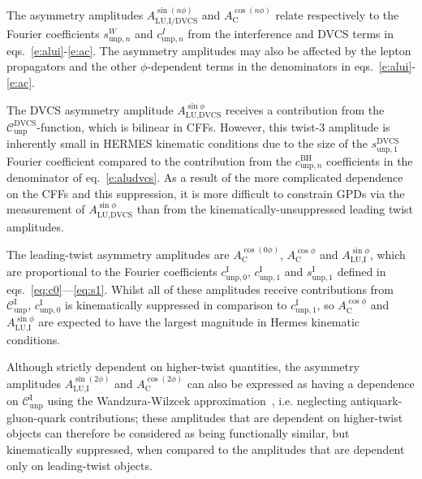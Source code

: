 The asymmetry amplitudes $A_{\textrm{LU,I/DVCS}}^{\sin(n\phi)}$ and
$A_{\textrm{C}}^{\cos(n\phi)}$ relate respectively to the Fourier
coefficients $s_{\textrm{unp},n}^{W}$ and $c_{\textrm{unp},n}^{I}$ from the interference and DVCS terms in eqs.~\ref{e:alui}-\ref{e:ac}. The asymmetry amplitudes
may also be affected by the lepton propagators and the other
$\phi$-dependent terms in the denominators in
eqs.~\ref{e:alui}-\ref{e:ac}.

The DVCS asymmetry amplitude $A^{\sin\phi}_{\textrm{LU,DVCS}}$ receives a
contribution from the $\mathcal{C}_{\textrm{unp}}^{\textrm{DVCS}}$-function,
which is bilinear in CFFs. However, this twist-3 amplitude is inherently small in HERMES kinematic conditions due to the size of the $s_{\textrm{unp},1}^{\textrm{DVCS}}$ Fourier coefficient compared to the contribution from the $c_{\textrm{unp},n}^{\textrm{BH}}$ coefficients in the denominator of eq.~\ref{e:aludvcs}. As a result of the more complicated dependence on the CFFs and this suppression, it
is more difficult to constrain GPDs via the measurement of $A^{\sin\phi}_{\textrm{LU,DVCS}}$ than from the kinematically-unsuppressed leading twist amplitudes.

The leading-twist asymmetry amplitudes are $A_{\textrm{C}}^{\cos(0\phi)}$, $A_{\textrm{C}}^{\cos\phi}$ and $A_{\textrm{LU,I}}^{\sin\phi}$, which are proportional to the Fourier coefficients $c_{\textrm{unp},0}^{\textrm{I}}$, $c_{\textrm{unp},1}^{\textrm{I}}$ and $s_{\textrm{unp},1}^{\textrm{I}}$ defined in eqs.~\ref{eq:c0}---\ref{eq:s1}. Whilst all of these amplitudes receive contributions from $\mathcal{C}_{\textrm{unp}}^{\textrm{I}}$, $c_{\textrm{unp},0}^{\textrm{I}}$ is kinematically suppressed in comparison to $c_{\textrm{unp},1}^{\textrm{I}}$, so $A_{\textrm{C}}^{\cos\phi}$ and $A_{\textrm{LU,I}}^{\sin\phi}$ are expected to have the largest magnitude in H{\sc ermes} kinematic conditions.

Although strictly dependent on higher-twist quantities, the asymmetry amplitudes $A_{\textrm{LU},\textrm{I}}^{\sin(2\phi)}$ and $A^{\cos(2\phi)}_{\textrm{C}}$ can also be expressed as having a dependence on $\mathcal{C}_{\textrm{unp}}^{\textrm{I}}$ using the Wandzura-Wilzcek approximation~\cite{Wan}, i.e. neglecting antiquark-gluon-quark contributions; these amplitudes that are dependent on higher-twist objects can therefore be considered as being functionally similar, but kinematically suppressed, when compared to the amplitudes that are dependent only on leading-twist objects.

